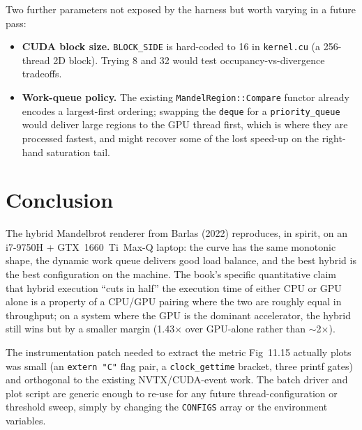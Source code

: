 \documentclass[
	english,
	letterpaper, oneside
]{article}
\begin{document}
Two further parameters not exposed by the harness but worth varying
in a future pass:

\begin{itemize}
    \item \textbf{CUDA block size.} \texttt{BLOCK\_SIDE} is hard-coded
    to 16 in \texttt{kernel.cu} (a 256-thread 2D block). Trying 8 and
    32 would test occupancy-vs-divergence tradeoffs.
    \item \textbf{Work-queue policy.} The existing
    \texttt{MandelRegion::Compare} functor already encodes a
    largest-first ordering; swapping the \texttt{deque} for a
    \texttt{priority\_queue} would deliver large regions to the GPU
    thread first, which is where they are processed fastest, and
    might recover some of the lost speed-up on the right-hand
    saturation tail.
\end{itemize}

\section{Conclusion}

The hybrid Mandelbrot renderer from Barlas (2022) reproduces, in
spirit, on an i7-9750H + GTX~1660~Ti~Max-Q laptop: the curve has the
same monotonic shape, the dynamic work queue delivers good load
balance, and the best hybrid is the best configuration on the machine.
The book's specific quantitative claim that hybrid execution
``cuts in half'' the execution time of either CPU or GPU alone is a
property of a CPU/GPU pairing where the two are roughly equal in
throughput; on a system where the GPU is the dominant accelerator, the
hybrid still wins but by a smaller margin (1.43$\times$ over GPU-alone
rather than $\sim$2$\times$).

The instrumentation patch needed to extract the metric Fig~11.15
actually plots was small (an \texttt{extern "C"} flag pair, a
\texttt{clock\_gettime} bracket, three printf gates) and orthogonal to
the existing NVTX/CUDA-event work. The batch driver and plot script are
generic enough to re-use for any future thread-configuration or
threshold sweep, simply by changing the \texttt{CONFIGS} array or the
environment variables.
\end{document}
